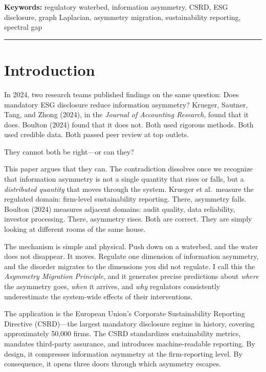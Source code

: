 \documentclass[12pt,a4paper]{article}
\begin{document}
\vspace{0.4em}

{\small\textbf{Keywords:} regulatory waterbed, information asymmetry, CSRD, ESG disclosure, graph Laplacian, asymmetry migration, sustainability reporting, spectral gap}

\noindent\rule{\textwidth}{0.4pt}

\vspace{0.5cm}


\section{Introduction}
\label{sec:intro}

In 2024, two research teams published findings on the same question: Does mandatory ESG disclosure reduce information asymmetry? Krueger, Sautner, Tang, and Zhong (2024), in the \textit{Journal of Accounting Research}, found that it does. Boulton (2024) found that it does not. Both used rigorous methods. Both used credible data. Both passed peer review at top outlets.

They cannot both be right---or can they?

This paper argues that they can. The contradiction dissolves once we recognize that information asymmetry is not a single quantity that rises or falls, but a \textit{distributed quantity} that moves through the system. Krueger et al.\ measure the regulated domain: firm-level sustainability reporting. There, asymmetry falls. Boulton (2024) measures adjacent domains: audit quality, data reliability, investor processing. There, asymmetry rises. Both are correct. They are simply looking at different rooms of the same house.

The mechanism is simple and physical. Push down on a waterbed, and the water does not disappear. It moves. Regulate one dimension of information asymmetry, and the disorder migrates to the dimensions you did not regulate. I call this the \textit{Asymmetry Migration Principle}, and it generates precise predictions about \textit{where} the asymmetry goes, \textit{when} it arrives, and \textit{why} regulators consistently underestimate the system-wide effects of their interventions.

The application is the European Union's Corporate Sustainability Reporting Directive (CSRD)---the largest mandatory disclosure regime in history, covering approximately 50,000 firms. The CSRD standardizes sustainability metrics, mandates third-party assurance, and introduces machine-readable reporting. By design, it compresses information asymmetry at the firm-reporting level. By consequence, it opens three doors through which asymmetry escapes.
\end{document}
